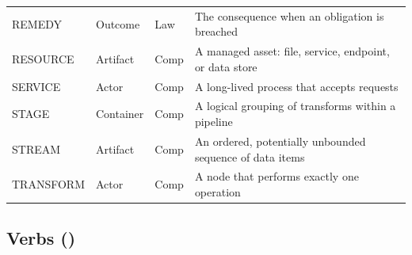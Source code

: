 \documentclass{article}
\begin{document}
\begin{tabular}{lllp{7cm}}
REMEDY & Outcome & Law & The consequence when an obligation is breached \\
RESOURCE & Artifact & Comp & A managed asset: file, service, endpoint, or data store \\
SERVICE & Actor & Comp & A long-lived process that accepts requests \\
STAGE & Container & Comp & A logical grouping of transforms within a pipeline \\
STREAM & Artifact & Comp & An ordered, potentially unbounded sequence of data items \\
TRANSFORM & Actor & Comp & A node that performs exactly one operation \\
\bottomrule
\end{tabular}
\normalsize

\subsection{Verbs (\VocabVerbs)}
\end{document}
